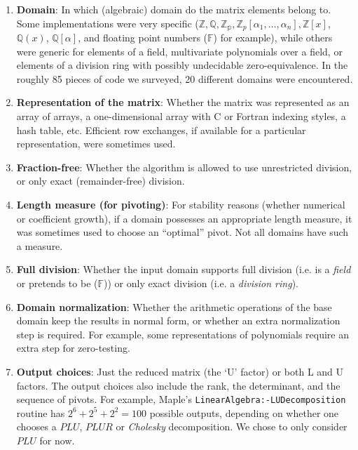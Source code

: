 \documentclass[draft]{elsart}
\newcommand{\floats}{\mathbb{F}}
\begin{document}
\begin{enumerate}
	\item \textbf{Domain}: In which (algebraic) domain do the matrix
		elements belong to.  Some implementations were very specific
		($\mathbb{Z}, \mathbb{Q}, \mathbb{Z_p}, 
		\mathbb{Z}_p\left[\alpha_1,\ldots,\alpha_n\right], 
		\mathbb{Z}\left[x\right]$, $\mathbb{Q}\left(x\right)$, 
		$\mathbb{Q}\left[\alpha\right]$, and floating point numbers 
		($\floats$) for 
		example), while others were generic for elements of a field,
		multivariate polynomials over a field, or elements of a division ring
		with possibly undecidable zero-equivalence.  In the roughly 85 pieces
		of code we surveyed, 20 different domains were encountered.
	\item \textbf{Representation of the matrix}: Whether the matrix
		was represented as an array of arrays, a
		one-dimensional array with C or Fortran indexing styles, 
		a hash table, etc. Efficient row exchanges, if available for a
		particular representation, were sometimes used.
	\item \textbf{Fraction-free}: Whether the 
		algorithm is allowed to use unrestricted division, or only
		exact (remainder-free) division.
	\item \textbf{Length measure (for pivoting)}:  For stability reasons
		(whether numerical or coefficient growth), if a domain 
	  possesses
		an appropriate length measure, it was sometimes used to choose
		an ``optimal'' pivot.  Not all domains have such a measure.
	\item \textbf{Full division}: Whether the input domain supports full
		division (i.e. is a \emph{field} or pretends to be ($\floats$)) 
		or only exact division (i.e. a \emph{division ring}).
	\item \textbf{Domain normalization}: Whether the arithmetic operations
		of the base domain keep the results in normal form, or whether
		an extra normalization step is required.  For example, some 
		representations of polynomials require an extra step for
		zero-testing.
	\item \textbf{Output choices}:  Just the reduced matrix
		(the `U' factor) or both L and U factors. The output
	  choices also include
		the rank, the determinant, and the sequence of 
		pivots.  For example, Maple's
		\texttt{LinearAlgebra:-LUDecomposition} routine has
		$2^6 + 2^5 + 2^2 = 100$ possible outputs, depending on whether
		one chooses a $PLU$, $PLUR$ or \emph{Cholesky} 
		decomposition.  We chose to only consider $PLU$ for now.

\end{enumerate}
\end{document}
